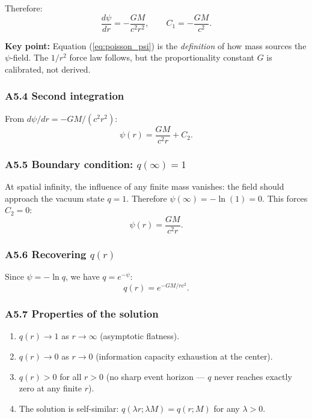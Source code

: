 \documentclass[reprint]{revtex4-2}
\begin{document}
Therefore:
\begin{equation}
\frac{d\psi}{dr} = -\frac{GM}{c^2 r^2}, \qquad C_1 = -\frac{GM}{c^2}.
\label{eq:C1_value}
\end{equation}

\textbf{Key point:} Equation (\ref{eq:poisson_psi}) is the \emph{definition} of how mass sources the $\psi$-field. The $1/r^2$ force law follows, but the proportionality constant $G$ is calibrated, not derived.

\subsubsection{A5.4 Second integration}

From $d\psi/dr = -GM/(c^2 r^2)$:
\begin{equation}
\psi(r) = \frac{GM}{c^2 r} + C_2.
\end{equation}

\subsubsection{A5.5 Boundary condition: $q(\infty)=1$}

At spatial infinity, the influence of any finite mass vanishes: the field should approach the vacuum state $q=1$. Therefore $\psi(\infty) = -\ln(1) = 0$. This forces $C_2 = 0$:
\begin{equation}
\psi(r) = \frac{GM}{c^2 r}.
\end{equation}

\subsubsection{A5.6 Recovering $q(r)$}

Since $\psi = -\ln q$, we have $q = e^{-\psi}$:
\begin{equation}
\boxed{q(r) = e^{-GM/rc^2}}.
\label{eq:q_spherical}
\end{equation}

\subsubsection{A5.7 Properties of the solution}

\begin{enumerate}[label=(\roman*)]
\item $q(r) \to 1$ as $r\to\infty$ (asymptotic flatness).
\item $q(r) \to 0$ as $r\to 0$ (information capacity exhaustion at the center).
\item $q(r) > 0$ for all $r > 0$ (no sharp event horizon --- $q$ never reaches exactly zero at any finite $r$).
\item The solution is self-similar: $q(\lambda r; \lambda M) = q(r; M)$ for any $\lambda > 0$.
\end{enumerate}
\end{document}
